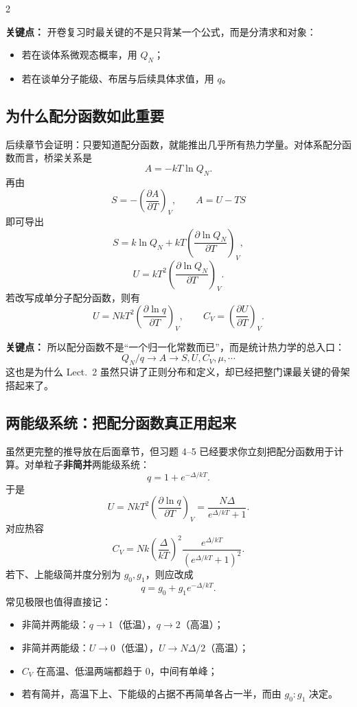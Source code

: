 \documentclass[a4paper,9pt]{article}
\newenvironment{keypoint}
{\par\vspace{0.3em}\noindent\begin{tcolorbox}[
  colback=keybg,
  colframe=keycolor,
  boxrule=0.5pt,
  arc=2pt,
  left=2pt,
  right=2pt,
  top=2pt,
  bottom=2pt,
  boxsep=0pt,
  ]
\noindent\textcolor{keycolor}{\textbf{关键点：}}}
{\end{tcolorbox}\par\vspace{0.3em}}
\begin{document}
\begin{multicols}{2}
	\begin{keypoint}
		开卷复习时最关键的不是只背某一个公式，而是分清求和对象：
		\begin{itemize}
			\item 若在谈体系微观态概率，用 $Q_N$；
			\item 若在谈单分子能级、布居与后续具体求值，用 $q$。
		\end{itemize}
	\end{keypoint}

	\subsection{为什么配分函数如此重要}
	后续章节会证明：只要知道配分函数，就能推出几乎所有热力学量。对体系配分函数而言，桥梁关系是
	\[
		A=-kT\ln Q_N.
	\]
	再由
	\[
		S=-\left(\frac{\partial A}{\partial T}\right)_V,
		\qquad
		A=U-TS
	\]
	即可导出
	\[
		S=k\ln Q_N+kT\left(\frac{\partial\ln Q_N}{\partial T}\right)_V,
	\]
	\[
		U=kT^2\left(\frac{\partial\ln Q_N}{\partial T}\right)_V.
	\]
	若改写成单分子配分函数，则有
	\[
		U=NkT^2\left(\frac{\partial\ln q}{\partial T}\right)_V,
		\qquad
		C_V=\left(\frac{\partial U}{\partial T}\right)_V.
	\]

	\begin{keypoint}
		所以配分函数不是“一个归一化常数而已”，而是统计热力学的总入口：
		\[
			Q_N/q \longrightarrow A \longrightarrow S,U,C_V,\mu,\cdots
		\]
		这也是为什么 Lect.~2 虽然只讲了正则分布和定义，却已经把整门课最关键的骨架搭起来了。
	\end{keypoint}

	\subsection{两能级系统：把配分函数真正用起来}
	虽然更完整的推导放在后面章节，但习题 4--5 已经要求你立刻把配分函数用于计算。对单粒子\textbf{非简并}两能级系统：
	\[
		q=1+e^{-\Delta/kT}.
	\]
	于是
	\[
		U=NkT^2\left(\frac{\partial\ln q}{\partial T}\right)_V
		=\frac{N\Delta}{e^{\Delta/kT}+1}.
	\]
	对应热容
	\[
		C_V=Nk\left(\frac{\Delta}{kT}\right)^2
		\frac{e^{\Delta/kT}}{(e^{\Delta/kT}+1)^2}.
	\]
	若下、上能级简并度分别为 $g_0,g_1$，则应改成
	\[
		q=g_0+g_1e^{-\Delta/kT}.
	\]
	常见极限也值得直接记：
	\begin{itemize}
		\item 非简并两能级：$q\to 1$（低温），$q\to 2$（高温）；
		\item 非简并两能级：$U\to 0$（低温），$U\to N\Delta/2$（高温）；
		\item $C_V$ 在高温、低温两端都趋于 0，中间有单峰；
		\item 若有简并，高温下上、下能级的占据不再简单各占一半，而由 $g_0:g_1$ 决定。
	\end{itemize}


\end{multicols}
\end{document}
